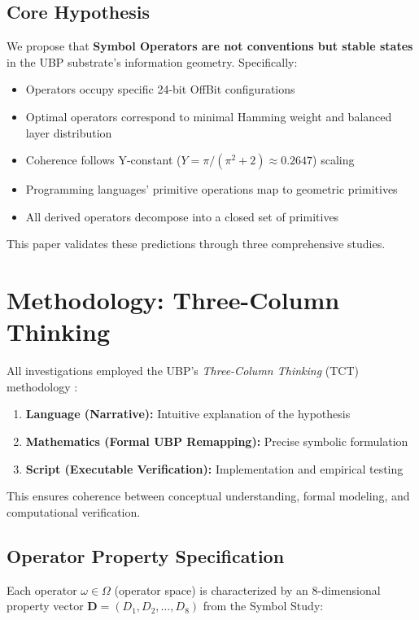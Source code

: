 \documentclass[12pt,a4paper]{article}
\begin{document}
\subsection{Core Hypothesis}

We propose that \textbf{Symbol Operators are not conventions but stable states} in the UBP substrate's information geometry. Specifically:

\begin{itemize}
    \item Operators occupy specific 24-bit OffBit configurations
    \item Optimal operators correspond to minimal Hamming weight and balanced layer distribution
    \item Coherence follows Y-constant ($Y = \pi/(\pi^2+2) \approx 0.2647$) scaling
    \item Programming languages' primitive operations map to geometric primitives
    \item All derived operators decompose into a closed set of primitives
\end{itemize}

This paper validates these predictions through three comprehensive studies.

\section{Methodology: Three-Column Thinking}

All investigations employed the UBP's \emph{Three-Column Thinking} (TCT) methodology \cite{TCT_Framework}:

\begin{enumerate}
    \item \textbf{Language (Narrative):} Intuitive explanation of the hypothesis
    \item \textbf{Mathematics (Formal UBP Remapping):} Precise symbolic formulation
    \item \textbf{Script (Executable Verification):} Implementation and empirical testing
\end{enumerate}

This ensures coherence between conceptual understanding, formal modeling, and computational verification.

\subsection{Operator Property Specification}

Each operator $\omega \in \Omega$ (operator space) is characterized by an 8-dimensional property vector $\mathbf{D} = (D_1, D_2, \ldots, D_8)$ from the Symbol Study:
\end{document}
